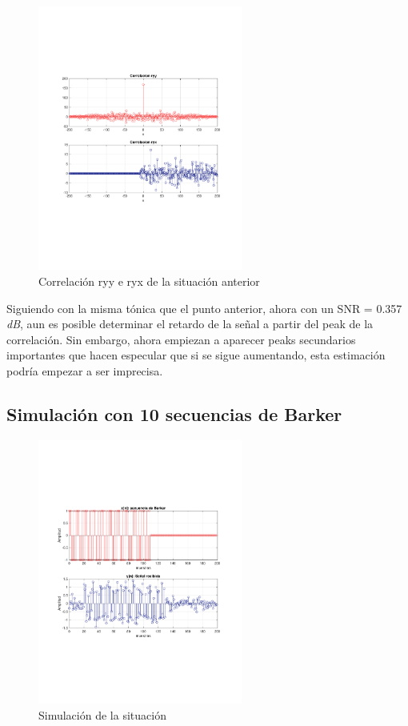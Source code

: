 			\begin{figure}[H]
			\center
			\includegraphics[width=0.6\textwidth,clip, trim = {2cm 7.0cm 2.2cm 7.0cm}]{../imgs/4_radar_d_1_corre.pdf}
			\caption{Correlación ryy e ryx de la situación anterior}
			\label{fig:radar_d_1_corre}
		\end{figure}
		
		Siguiendo con la misma tónica que el punto anterior, ahora con un SNR = 0.357 \textit{dB}, aun es posible determinar el retardo de la señal a partir del peak de la correlación. Sin embargo, ahora empiezan a aparecer peaks secundarios importantes que hacen especular que si se sigue aumentando, esta estimación podría empezar a ser imprecisa.
		
		\subsection{Simulación con 10 secuencias de Barker}
			\begin{figure}[H]
			\center
			\includegraphics[width=0.6\textwidth,clip, trim = {2cm 7.0cm 2.2cm 7.0cm}]{../imgs/4_radar_e_signal.pdf}
			\caption{Simulación de la situación}
			\label{fig:radar_e_signal}
		\end{figure}
		
